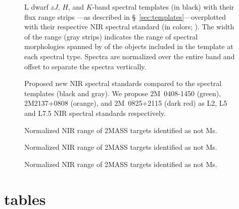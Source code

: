 \documentclass[12pt,preprint]{aastex}
\begin{document}
\clearpage

\begin{figure}
		\caption{
	L dwarf $zJ$, $H$, and $K$-band spectral templates (in black) with their flux range strips ---as described in \S~\ref{sec:templates}---overplotted with their respective NIR spectral standard (in colors; \cite{Kirkpatrick10}). 
	The width of the range (gray strips) indicates the range of spectral morphologies spanned by of the objects included in the template at each spectral type.
	Spectra are normalized over the entire band and offset to separate the spectra vertically.
	}
	\label{fig:templates-stds}
\end{figure}

\begin{figure}
		\caption{Proposed new NIR spectral standards compared to the spectral templates (black and gray).
		We propose 2M~0408-1450 (green), 2M2137+0808 (orange), and 2M~0825+2115 (dark red) as L2, L5 and L7.5 NIR spectral standards respectively.
		}
	\label{fig:templates-newstds}
\end{figure}


\begin{figure}
	\caption{Normalized NIR range of 2MASS targets identified as not Ms.}
	\label{fig:notMs_1}
\end{figure}

\begin{figure}
	\caption{Normalized NIR range of 2MASS targets identified as not Ms.}
\end{figure}

\begin{figure}
	\caption{Normalized NIR range of 2MASS targets identified as not Ms.}
\end{figure}

\clearpage

\section{tables}
\end{document}

